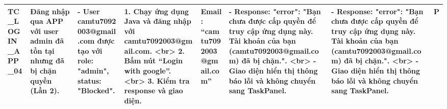 \documentclass[a4paper,12pt]{article}
\begin{document}
\begin{longtable}{|p{2cm}|p{3cm}|p{3cm}|p{4cm}|p{3cm}|p{3cm}|p{3cm}|p{2cm}|}
    TC_LOGIN_APP_04 & Đăng nhập qua APP với user admin đã tồn tại nhưng đã bị chặn quyền (Lần 2). & - User camtu7092003@gmail.com được tạo với role: "admin", status: "Blocked". & 1. Chạy ứng dụng Java và đăng nhập với camtu7092003@gmail.com. <br> 2. Bấm nút “Login with google”. <br> 3. Kiểm tra response và giao diện. & Email: “camtu7092003@gmail.com” & - Response: {"error": "Bạn chưa được cấp quyền để truy cập ứng dụng này. Tài khoản của bạn (camtu7092003@gmail.com) đã bị chặn."}. <br> - Giao diện hiển thị thông báo lỗi và không chuyển sang TaskPanel. & - Response: {"error": "Bạn chưa được cấp quyền để truy cập ứng dụng này. Tài khoản của bạn (camtu7092003@gmail.com) đã bị chặn."}. <br> - Giao diện hiển thị thông báo lỗi và không chuyển sang TaskPanel. & P \\ \hline
\end{longtable}
\end{document}
